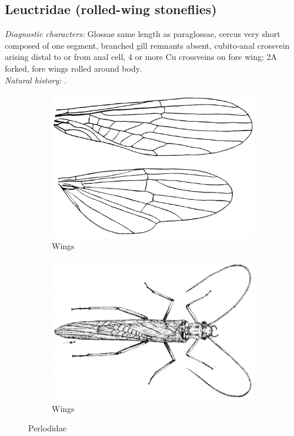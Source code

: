 \documentclass[letterpaper, 11pt]{article}
\begin{document}
\subsection{Leuctridae (rolled-wing stoneflies)}%
\noindent{}\textit{Diagnostic characters:} Glossae same length as paraglossae, cercus very short composed of one segment, branched gill remnants absent, cubito-anal crossvein arising distal to or from anal cell, 4 or more Cu crossveins on fore wing; 2A forked, fore wings rolled around body.\\

\noindent{}\textit{Natural history:} .\\

\begin{figure}[ht!]
    \centering
    \begin{subfigure}[ht!]{0.4\textwidth}
        \includegraphics[width=\textwidth]{LeuctridWings}
        \caption{Wings \citep[modified from][Plate 32, Fig. 1]{bhl29875}}
        \label{fig:leuctrid1}
    \end{subfigure}
    \qquad
    \begin{subfigure}[ht!]{0.5\textwidth}
        \includegraphics[width=\textwidth]{LeuctridHabitus}
        \caption{Wings \citep[modified from][Fig. 26]{bhl29875}}
        \label{fig:leuctrid2}
    \end{subfigure}
    \caption{Perlodidae}\label{fig:leuctrids}
\end{figure}
\end{document}

